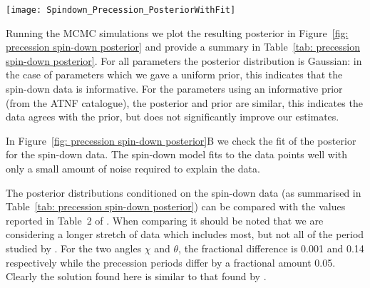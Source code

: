 \documentclass[../full_thesis/full_thesis.tex]{subfiles}
\newcommand{\thisdir}{../comparing_periodic_modulations}
\begin{document}
\begin{figure*}
\centering
\texttt{[image: Spindown\_Precession\_PosteriorWithFit]}
\caption{$\textbf{A}$: The estimated marginal posterior probability distribution for the
precession spin-down model parameters. For the secular spin-down
quantities, we show the difference with respect to the values as listed in
Table~\ref{tab: ATNF}.
$\textbf{B}$: Checking the fit of the model using the
maximum posterior values to the data; see Figure~\ref{fig: noise-only beam-width
posterior fit} for a complete description.}
\label{fig: precession spin-down posterior}
\end{figure*}
Running the MCMC simulations we plot the resulting
posterior in Figure~\ref{fig: precession spin-down posterior} and provide a
summary in Table~\ref{tab: precession spin-down posterior}. For all parameters
the posterior distribution is Gaussian: in the case of parameters which we gave
a uniform prior, this indicates that the spin-down data is informative. For the
parameters using an informative prior (from the ATNF catalogue), the posterior
and prior are similar, this indicates the data agrees with the prior, but does
not significantly improve our estimates.
\begin{table}
\centering
\caption{Posterior estimates for the spin-down precession model. For the secular spin-down
quantities, we report the posterior difference with respect to the values as listed in
Table~\ref{tab: ATNF}.}
\label{tab: precession spin-down posterior}

\end{table}

In Figure~\ref{fig: precession spin-down posterior}B we check the fit of the
posterior for the spin-down data. The spin-down model fits to the data points
well with only a small amount of noise required to explain the data.

The posterior distributions conditioned on the spin-down data (as summarised in
Table~\ref{tab: precession spin-down posterior}) can be compared with the
values reported in Table~2 of \citet{Link2001}. When comparing it should be
noted that we are considering a longer stretch of data which includes most, but
not all of the period studied by \citet{Link2001}. For the two angles $\chi$
and $\theta$, the fractional difference is 0.001 and 0.14 respectively while
the precession periods differ by a fractional amount 0.05. Clearly the solution found here
is similar to that found by \citet{Link2001}.
\end{document}
